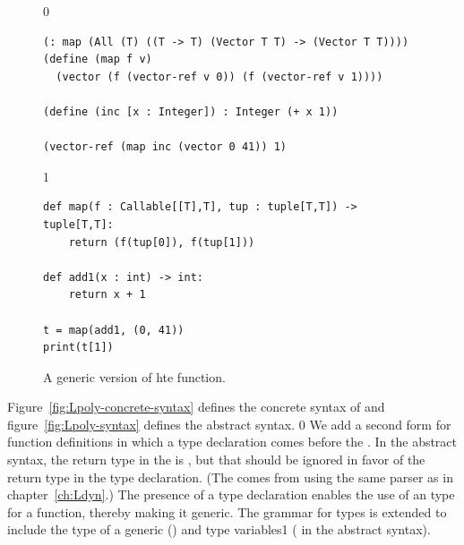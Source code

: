 \documentclass[7x10]{TimesAPriori_MIT}%
\def\racketEd{0}
\def\pythonEd{1}
\def\edition{0}
\newcommand{\python}[1]{{\if\edition\pythonEd #1\fi}}
\numberwithin{theorem}{chapter}
\numberwithin{definition}{chapter}
\numberwithin{equation}{chapter}
\begin{document}
\begin{figure}[tbp]
\begin{tcolorbox}[colback=white]  
\if\edition\racketEd
\begin{lstlisting}
(: map (All (T) ((T -> T) (Vector T T) -> (Vector T T))))
(define (map f v)
  (vector (f (vector-ref v 0)) (f (vector-ref v 1))))

(define (inc [x : Integer]) : Integer (+ x 1))

(vector-ref (map inc (vector 0 41)) 1)
\end{lstlisting}
\fi
\if\edition\pythonEd
\begin{lstlisting}
def map(f : Callable[[T],T], tup : tuple[T,T]) -> tuple[T,T]:
    return (f(tup[0]), f(tup[1]))

def add1(x : int) -> int:
    return x + 1

t = map(add1, (0, 41))
print(t[1])
\end{lstlisting}
\fi
\end{tcolorbox}

\caption{A generic version of hte  function.}
\label{fig:map-poly}
\end{figure}

Figure~\ref{fig:Lpoly-concrete-syntax} defines the concrete syntax of
\LangPoly{} and figure~\ref{fig:Lpoly-syntax} defines the abstract
syntax.
%
\if\edition\racketEd
We add a second form for function definitions in which a type
declaration comes before the . In the abstract syntax,
the return type in the  is \CANYTY{}, but that should be
ignored in favor of the return type in the type declaration.  (The
\CANYTY{} comes from using the same parser as in
chapter~\ref{ch:Ldyn}.)  The presence of a type declaration
enables the use of an  type for a function, thereby making
it generic.
\fi
%
The grammar for types is extended to include the type of a generic
() and type variables\python{ ( in the
  abstract syntax)}.

\newcommand{\LpolyGrammarRacket}{
\begin{array}{lcl}
  \Type &::=& \LP\key{All}~\LP\Var\ldots\RP~ \Type\RP \MID \Var \\
  \Def &::=& \LP\key{:}~\Var~\Type\RP \\
    &&       \LP\key{define}~ \LP\Var ~ \Var\ldots\RP ~ \Exp\RP 
\end{array}
}

\newcommand{\LpolyASTRacket}{
\begin{array}{lcl}
  \Type &::=& \LP\key{All}~\LP\Var\ldots\RP~ \Type\RP \MID \Var \\
  \Def &::=& \DECL{\Var}{\Type} \\
   &&  \DEF{\Var}{\LP\Var \ldots\RP}{\key{'Any}}{\code{'()}}{\Exp}  
\end{array}
}  
\end{document}
